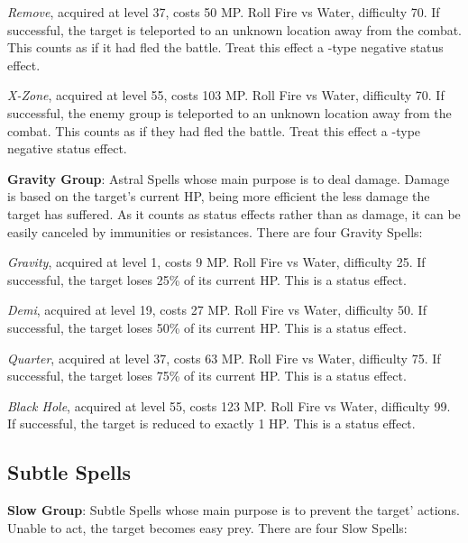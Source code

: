 \begin{multicols}{2}
    \textit{Remove}, acquired at level 37, costs 50 MP\@. Roll Fire vs Water, difficulty 70. If successful, the target is teleported to an unknown location away from the combat. This counts as if it had fled the battle. Treat this effect a -type negative status effect.
    
    \textit{X-Zone}, acquired at level 55, costs 103 MP\@. Roll Fire vs Water, difficulty 70. If successful, the enemy group is teleported to an unknown location away from the combat. This counts as if they had fled the battle. Treat this effect a -type negative status effect.
 
    \ffcrystal[type=level,height=8pt]
   
    \textbf{Gravity Group}: Astral Spells whose main purpose is to deal damage. Damage is based on the target’s current HP, being more efficient the less damage the target has suffered. As it counts as status effects rather than as damage, it can be easily canceled by immunities or resistances. There are four Gravity Spells:
    
    \textit{Gravity}, acquired at level 1, costs 9 MP\@. Roll Fire vs Water, difficulty 25. If successful, the target loses 25\% of its current HP\@. This is a  status effect.
    
    \textit{Demi}, acquired at level 19, costs 27 MP\@. Roll Fire vs Water, difficulty 50. If successful, the target loses 50\% of its current HP\@. This is a  status effect.
    
    \textit{Quarter}, acquired at level 37, costs 63 MP\@. Roll Fire vs Water, difficulty 75. If successful, the target loses 75\% of its current HP\@. This is a  status effect.
    
    \textit{Black Hole}, acquired at level 55, costs 123 MP\@. Roll Fire vs Water, difficulty 99. If successful, the target is reduced to exactly 1 HP\@. This is a  status effect.
    
    \subsection{Subtle Spells}\label{subsec:time-subtle}

    \textbf{Slow Group}: Subtle Spells whose main purpose is to prevent the target’ actions. Unable to act, the target becomes easy prey. There are four Slow Spells:
    

\end{multicols}
